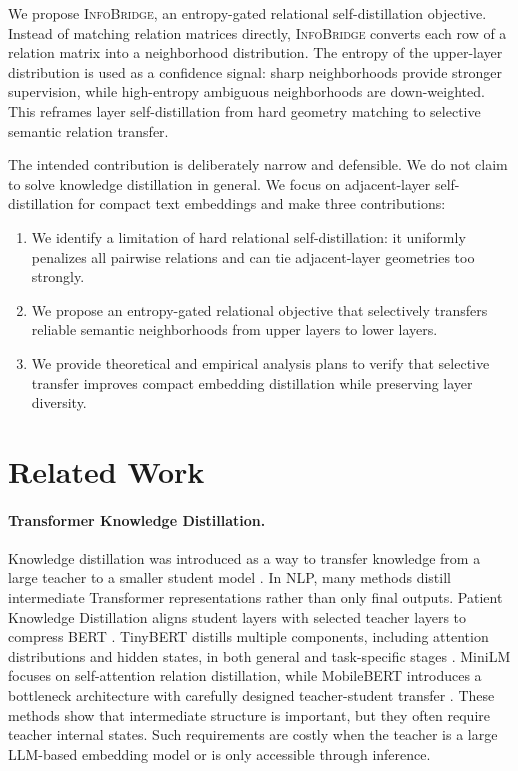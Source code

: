 \documentclass[letterpaper]{article}
\begin{document}
We propose \textsc{InfoBridge}, an entropy-gated relational self-distillation objective. Instead of matching relation matrices directly, \textsc{InfoBridge} converts each row of a relation matrix into a neighborhood distribution. The entropy of the upper-layer distribution is used as a confidence signal: sharp neighborhoods provide stronger supervision, while high-entropy ambiguous neighborhoods are down-weighted. This reframes layer self-distillation from hard geometry matching to selective semantic relation transfer.

The intended contribution is deliberately narrow and defensible. We do not claim to solve knowledge distillation in general. We focus on adjacent-layer self-distillation for compact text embeddings and make three contributions:
\begin{enumerate}
    \item We identify a limitation of hard relational self-distillation: it uniformly penalizes all pairwise relations and can tie adjacent-layer geometries too strongly.
    \item We propose an entropy-gated relational objective that selectively transfers reliable semantic neighborhoods from upper layers to lower layers.
    \item We provide theoretical and empirical analysis plans to verify that selective transfer improves compact embedding distillation while preserving layer diversity.
\end{enumerate}

\section{Related Work}

\paragraph{Transformer Knowledge Distillation.}
Knowledge distillation was introduced as a way to transfer knowledge from a large teacher to a smaller student model \cite{hinton2015distilling}. In NLP, many methods distill intermediate Transformer representations rather than only final outputs. Patient Knowledge Distillation aligns student layers with selected teacher layers to compress BERT \cite{sun2019patient}. TinyBERT distills multiple components, including attention distributions and hidden states, in both general and task-specific stages \cite{jiao2020tinybert}. MiniLM focuses on self-attention relation distillation, while MobileBERT introduces a bottleneck architecture with carefully designed teacher-student transfer \cite{wang2020minilm,sun2020mobilebert}. These methods show that intermediate structure is important, but they often require teacher internal states. Such requirements are costly when the teacher is a large LLM-based embedding model or is only accessible through inference.
\end{document}
